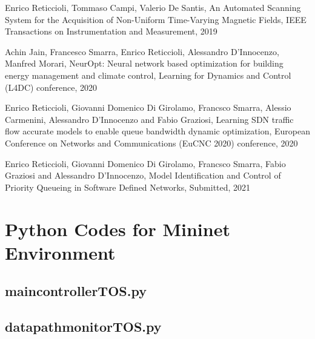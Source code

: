 \documentclass[12pt, a4paper, twoside, openright]{ociamthesis}  %
\begin{document}
{}
\renewcommand{\bibname}{References}
{}
\renewcommand{\bibname}{Publications}

\begin{thebibliography}{4}
 Enrico Reticcioli, Tommaso Campi, Valerio De Santis, An Automated Scanning System for the Acquisition of Non-Uniform Time-Varying Magnetic Fields, IEEE Transactions on Instrumentation and Measurement, 2019

Achin Jain, Francesco Smarra, Enrico Reticcioli, Alessandro D'Innocenzo, Manfred Morari, NeurOpt: Neural network based optimization for building energy management and climate control, Learning for Dynamics and Control (L4DC) conference, 2020

Enrico Reticcioli, Giovanni Domenico Di Girolamo, Francsco Smarra, Alessio Carmenini, Alessandro D’Innocenzo and Fabio Graziosi, Learning SDN traffic flow accurate models to enable queue bandwidth dynamic optimization, European Conference on Networks and Communications (EuCNC 2020) conference, 2020

Enrico Reticcioli, Giovanni Domenico Di Girolamo, Francsco Smarra, Fabio Graziosi and Alessandro D’Innocenzo, Model Identification and Control of Priority Queueing in Software Defined Networks, Submitted, 2021
\end{thebibliography}
%

\appendix
\lstset{firstnumber=1}
\chapter{Python Codes for Mininet Environment}\label{Py_codes}
\section{main\textunderscore controller\textunderscore TOS.py}\label{main_controller_TOS}

\section{datapath\textunderscore monitor\textunderscore TOS.py}\label{datapath_monitor_TOS}

\end{document}
